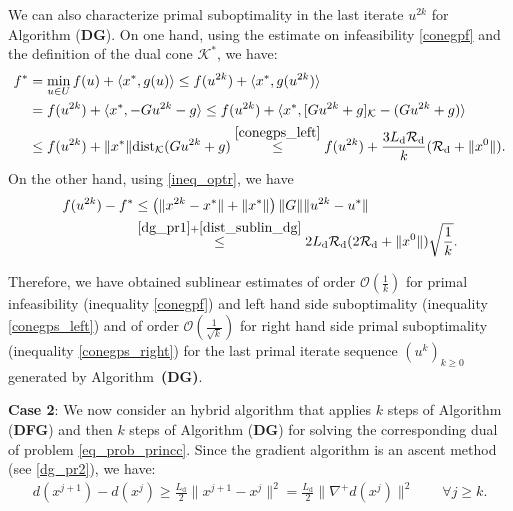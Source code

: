 \documentclass{gOMS2e}
\theoremstyle{plain}
\theoremstyle{definition}
\theoremstyle{remark}
\providecommand{\norm}[1]{\lVert#1\rVert}
\begin{document}
\noindent We can also characterize primal suboptimality in the last
iterate $u^{2k} $ for Algorithm (\textbf{DG}). On one hand, using
the  estimate on infeasibility  \eqref{conegpf} and the definition
of the dual cone ${\mathcal{K}}^*$, we have:
\begin{align}\label{conegps_left}
f^* &=  \min_{u \in U} f(u) + \langle x^*, g(u) \rangle \leq f(u^{2k})
+ \langle x^*, g(u^{2k}) \rangle \nonumber\\
& =  f(u^{2k}) + \langle x^*, -G u^{2k} - g \rangle \leq f(u^{2k})
+ \langle x^*,  [G u^{2k} + g]_{\mathcal{K}} - (G u^{2k} + g) \rangle \nonumber\\
& \leq f(u^{2k}) + \norm{x^*} \text{dist}_{\mathcal{K}}(G u^{2k} +
g)  \overset{\eqref{conegps_left}}{\leq} f(u^{2k}) + \frac{3
L_{\text{d}} \mathcal{R}_\text{d}}{k} ( \mathcal{R}_\text{d} +
\|x^0\|).
\end{align}
On the other hand, using \eqref{ineq_optr}, we have
\begin{align}
\label{conegps_right} f(u^{2k}) - f^* & \leq   \left( \|x^{2k} - x^*\| +
\|x^*\| \right )\|G\| \|u^{2k} - u^* \|  \nonumber \\
&\overset{\eqref{dg_pr1} + \eqref{dist_sublin_dg}}{\leq}  2
L_\text{d} \mathcal{R}_\text{d} (2 \mathcal{R}_\text{d} + \|x^0\|)
\sqrt{\frac{1}{k}}.
\end{align}

\noindent Therefore, we have obtained sublinear estimates  of order
$\mathcal{O}(\frac{1}{k})$ for primal infeasibility (inequality
\eqref{conegpf}) and left hand side suboptimality (inequality
\eqref{conegps_left}) and of order $\mathcal{O}(\frac{1}{\sqrt{k}})$
for right hand side primal suboptimality (inequality
\eqref{conegps_right}) for the last primal iterate sequence
$(u^k)_{k \geq 0}$ generated by Algorithm~\textbf{(DG)}.

\vspace{0.2cm}

\noindent \textbf{Case 2}:  We now consider an hybrid  algorithm
that applies  $k$ steps of  Algorithm (\textbf{DFG}) and then $k$
steps of  Algorithm  (\textbf{DG}) for solving the corresponding
dual of problem \eqref{eq_prob_princc}. Since  the gradient
algorithm is an ascent method (see \eqref{dg_pr2}), we have:
\begin{align*}
d(x^{j+1}) - d(x^j)  \geq  \frac{L_\text{d}}{2}  \|x^{j+1} - x^j
\|^2 =   \frac{L_\text{d}}{2} \|\nabla^+ d(x^j)\|^2   \qquad \forall
j \geq k.
\end{align*}
\end{document}
